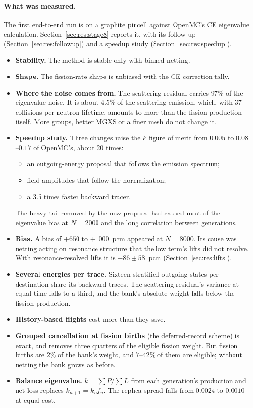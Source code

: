 \documentclass[11pt]{article}
\theoremstyle{definition}
\begin{document}
\paragraph{What was measured.} The first end-to-end run is on a graphite pincell against OpenMC's CE
eigenvalue calculation. Section~\ref{sec:res:stage8} reports it, with its follow-up
(Section~\ref{sec:res:followup}) and a speedup study (Section~\ref{sec:res:speedup}).
\begin{itemize}
\item \textbf{Stability.} The method is stable only with binned netting.
\item \textbf{Shape.} The fission-rate shape is unbiased with the CE correction tally.
\item \textbf{Where the noise comes from.} The scattering residual carries 97\% of the eigenvalue
  noise. It is about 4.5\% of the scattering emission, which, with 37 collisions per neutron
  lifetime, amounts to more than the fission production itself. More groups, better MGXS or a finer
  mesh do not change it.
\item \textbf{Speedup study.} Three changes raise the $k$ figure of merit from $0.005$ to
  $0.08$--$0.17$ of OpenMC's, about 20 times:
  \begin{itemize}
  \item an outgoing-energy proposal that follows the emission spectrum;
  \item field amplitudes that follow the normalization;
  \item a 3.5 times faster backward tracer.
  \end{itemize}
  The heavy tail removed by the new proposal had caused most of the eigenvalue bias at $N=2000$ and
  the long correlation between generations.
\item \textbf{Bias.} A bias of $+650$ to $+1000$~pcm appeared at $N=8000$. Its cause was netting
  acting on resonance structure that the low term's lifts did not resolve. With resonance-resolved
  lifts it is $-86\pm58$~pcm (Section~\ref{sec:res:lifts}).
\item \textbf{Several energies per trace.} Sixteen stratified outgoing states per destination share
  its backward traces. The scattering residual's variance at equal time falls to a third, and the
  bank's absolute weight falls below the fission production.
\item \textbf{History-based flights} cost more than they save.
\item \textbf{Grouped cancellation at fission births} (the deferred-record scheme) is exact, and
  removes three quarters of the eligible fission weight. But fission births are $2\%$ of the bank's
  weight, and $7$--$42\%$ of them are eligible; without netting the bank grows as before.
\item \textbf{Balance eigenvalue.} $k=\sum P/\sum L$ from each generation's production and net loss
  replaces $k_{n+1}=k_nf_n$. The replica spread falls from $0.0024$ to $0.0010$ at equal cost.
\end{itemize}
\end{document}
